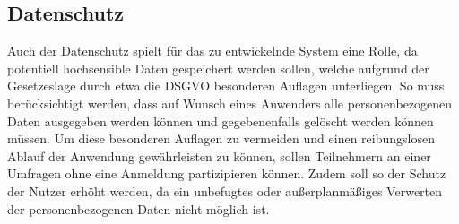 \subsection{Datenschutz}
Auch der Datenschutz spielt für das zu entwickelnde System eine Rolle, da potentiell hochsensible Daten gespeichert werden sollen, welche aufgrund der Gesetzeslage durch etwa die \ac*{DSGVO}\autocite{rf-dsgvo} besonderen Auflagen unterliegen.
So muss berücksichtigt werden, dass auf Wunsch eines Anwenders alle personenbezogenen Daten ausgegeben werden können und gegebenenfalls gelöscht werden können müssen.
Um diese besonderen Auflagen zu vermeiden und einen reibungslosen Ablauf der Anwendung gewährleisten zu können, sollen Teilnehmern an einer Umfragen ohne eine Anmeldung partizipieren können.
Zudem soll so der Schutz der Nutzer erhöht werden, da ein unbefugtes oder außerplanmäßiges Verwerten der personenbezogenen Daten nicht möglich ist.
